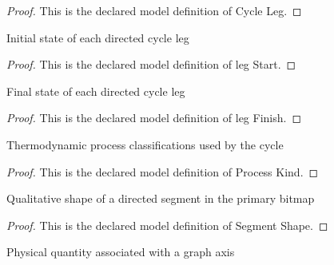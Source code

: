 \begin{proof}
  This is the declared model definition of Cycle Leg.
\end{proof}
\begin{definition}
  \label{def:physics:phyx-mini-0434:phyxminiproblems-problemphyxmini0434-legstart}
  Initial state of each directed cycle leg
\end{definition}
\begin{proof}
  This is the declared model definition of leg Start.
\end{proof}
\begin{definition}
  \label{def:physics:phyx-mini-0434:phyxminiproblems-problemphyxmini0434-legfinish}
  Final state of each directed cycle leg
\end{definition}
\begin{proof}
  This is the declared model definition of leg Finish.
\end{proof}
\begin{definition}
  \label{def:physics:phyx-mini-0434:phyxminiproblems-problemphyxmini0434-processkind}
  Thermodynamic process classifications used by the cycle
\end{definition}
\begin{proof}
  This is the declared model definition of Process Kind.
\end{proof}
\begin{definition}
  \label{def:physics:phyx-mini-0434:phyxminiproblems-problemphyxmini0434-segmentshape}
  Qualitative shape of a directed segment in the primary bitmap
\end{definition}
\begin{proof}
  This is the declared model definition of Segment Shape.
\end{proof}
\begin{definition}
  \label{def:physics:phyx-mini-0434:phyxminiproblems-problemphyxmini0434-axisquantity}
  Physical quantity associated with a graph axis
\end{definition}
